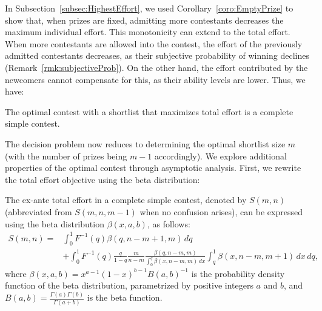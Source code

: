 


In Subsection~\ref{subsec:HighestEffort}, we used Corollary~\ref{coro:EmptyPrize} to show that, when prizes are fixed, admitting more contestants decreases the maximum individual effort. This monotonicity can extend to the total effort. When more contestants are allowed into the contest, the effort of the previously admitted contestants decreases, as their subjective probability of winning declines (Remark~\ref{rmk:subjectiveProb}). On the other hand, the effort contributed by the newcomers cannot compensate for this, as their ability levels are lower. Thus, we have:

\begin{proposition}\label{thm:ConpleteSimpleContest}
    The optimal contest with a shortlist that maximizes total effort is a complete simple contest.
\end{proposition}




The decision problem now reduces to determining the optimal shortlist size $m$ (with the number of prizes being $m-1$ accordingly). We explore additional properties of the optimal contest through asymptotic analysis. First, we rewrite the total effort objective using the beta distribution:
\begin{lemma}\label{lem:betaRepTotalEffort}
    The ex-ante total effort in a complete simple contest, denoted by $S(m,n)$ (abbreviated from $S(m,n,m-1)$ when no confusion arises), can be expressed using the beta distribution $\beta(x,a,b)$, as follows:
    \[
    \begin{aligned}
        S(m,n) = & 
        \int_0^1F^{-1}(q)\beta(q,n-m+1,m)\,dq \\
        & +\int_0^1F^{-1}(q)\frac{q}{1-q} \frac{m}{n-m}\frac{\beta(q,n-m,m)}{\int_0^q\beta(x,n-m,m)\,dx}\int_q^1\beta(x,n-m,m+1)\,dx\, dq,
    \end{aligned}
    \] where $\beta(x,a,b) =x^{a-1}(1-x)^{b-1}B(a,b)^{-1}$ is the probability density function of the beta distribution, parametrized by positive integers $a$ and $b$, and $B(a,b)=\frac{\Gamma(a)\Gamma(b)}{\Gamma(a+b)}$ is the beta function.
\end{lemma}

